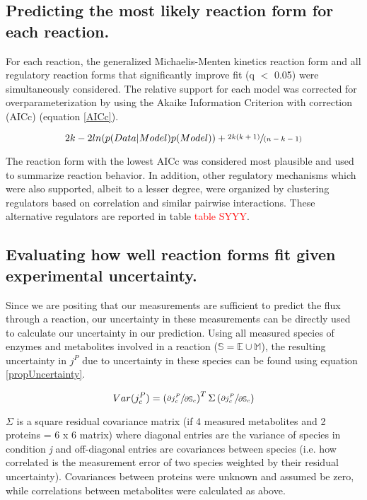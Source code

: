 \documentclass[12pt]{nature}\usepackage{graphicx, color}
\begin{document}
\subsection{Predicting the most likely reaction form for each reaction.}

For each reaction, the generalized Michaelis-Menten kinetics reaction form and all regulatory reaction forms that significantly improve fit (q $<$ 0.05) were simultaneously considered.  The relative support for each model was corrected for overparameterization by using the Akaike Information Criterion with correction (AICc) (equation \ref{AICc}).

\begin{equation}
2k - 2ln(p(Data|Model)p(Model)) + \sfrac{2k(k+1)}{(n-k-1)}\label{AICc}
\end{equation}

The reaction form with the lowest AICc was considered most plausible and used to summarize reaction behavior.  In addition, other regulatory mechanisms which were also supported, albeit to a lesser degree, were organized by clustering regulators based on correlation and similar pairwise interactions.  These alternative regulators are reported in table \textcolor{red}{table SYYY}.

\subsection{Evaluating how well reaction forms fit given experimental uncertainty.}

Since we are positing that our measurements are sufficient to predict the flux through a reaction, our uncertainty in these measurements can be directly used to calculate our uncertainty in our prediction.  Using all measured species of enzymes and metabolites involved in a reaction ($\mathbb{S} = \mathbb{E} \cup \mathbb{M}$), the resulting uncertainty in $j^{P}$ due to uncertainty in these species can be found using equation \ref{propUncertainty}.

\begin{equation}
Var(j^{P}_{c}) = \left(\sfrac{\partial j^{P}_{c}}{\partial\mathbb{S}_{c}}\right)^{T}\Sigma\left(\sfrac{\partial j^{P}_{c}}{\partial\mathbb{S}_{c}}\right)\label{propUncertainty}
\end{equation}

$\Sigma$ is a square residual covariance matrix (if 4 measured metabolites and 2 proteins = 6 x 6 matrix) where diagonal entries are the variance of species in condition \textit{j} and off-diagonal entries are covariances between species (i.e. how correlated is the measurement error of two species weighted by their residual uncertainty).  Covariances between proteins were unknown and assumed be zero, while correlations between metabolites were calculated as above.
\end{document}
